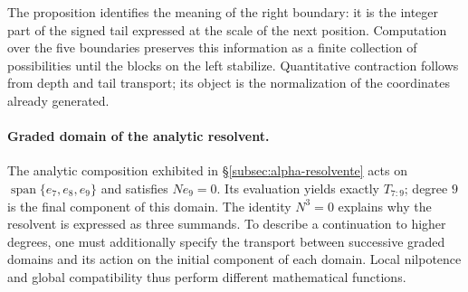 The proposition identifies the meaning of the right boundary: it is the
integer part of the signed tail expressed at the scale of the next
position. Computation over the five boundaries preserves this information
as a finite collection of possibilities until the blocks on the left stabilize.
Quantitative contraction follows from depth and tail transport;
its object is the normalization of the coordinates already generated.

\paragraph{Graded domain of the analytic resolvent.}
\label{ampl-alfa-dominio-resolvente}
The analytic composition exhibited in
\S\ref{subsec:alpha-resolvente} acts on
$\operatorname{span}\{e_7,e_8,e_9\}$ and satisfies $Ne_9=0$. Its
evaluation yields exactly $T_{7:9}$; degree $9$ is the final
component of this domain. The identity $N^3=0$ explains why the
resolvent is expressed as three summands. To describe a continuation
to higher degrees, one must additionally specify the transport
between successive graded domains and its action on the initial
component of each domain. Local nilpotence and global compatibility
thus perform different mathematical functions.
